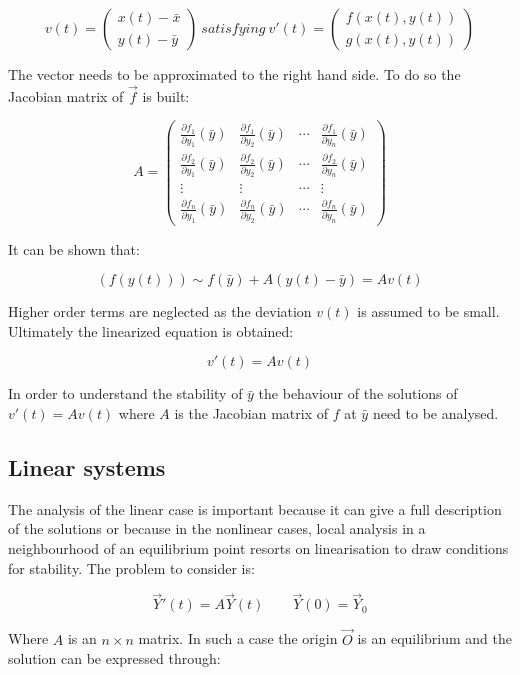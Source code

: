 	$$v(t) = \begin{pmatrix}x(t)-\bar{x}\\y(t)-\bar{y}\end{pmatrix}\ satisfying\ v'(t) = \begin{pmatrix}f(x(t),y(t))\\g(x(t), y(t))\end{pmatrix}$$

	The vector needs to be approximated to the right hand side.
	To do so the Jacobian matrix of $\vec{f}$ is built:

	$$A = \begin{pmatrix}\frac{\partial f_1}{\partial y_1}(\bar{y}) & \frac{\partial f_1}{\partial y_2}(\bar{y})&\cdots&\frac{\partial f_1}{\partial y_n}(\bar{y})\\\frac{\partial f_2}{\partial y_1}(\bar{y}) & \frac{\partial f_2}{\partial y_2}(\bar{y})&\cdots&\frac{\partial f_2}{\partial y_n}(\bar{y})\\\vdots&\vdots&\cdots&\vdots\\\frac{\partial f_n}{\partial y_1}(\bar{y}) & \frac{\partial f_n}{\partial y_2}(\bar{y})&\cdots&\frac{\partial f_n}{\partial y_n}(\bar{y})\end{pmatrix}$$

	It can be shown that:

	$$(f(y(t)))\sim f(\bar{y})+A(y(t)-\bar{y}) = Av(t)$$

	Higher order terms are neglected as the deviation $v(t)$ is assumed to be small.
	Ultimately the linearized equation is obtained:

	$$v'(t) = Av(t)$$

	In order to understand the stability of $\bar{y}$ the behaviour of the solutions of $v'(t) = Av(t)$ where $A$ is the Jacobian matrix of $f$ at $\bar{y}$ need to be analysed.

	\subsection{Linear systems}
	The analysis of the linear case is important because it can give a full description of the solutions or because in the nonlinear cases, local analysis in a neighbourhood of an equilibrium point resorts on linearisation to draw conditions for stability.
	The problem to consider is:

	$$\vec{Y}'(t) = A\vec{Y}(t)\qquad \vec{Y}(0) = \vec{Y}_0$$

	Where $A$ is an $n\times n$ matrix.
	In such a case the origin $\vec{O}$ is an equilibrium and the solution can be expressed through:

